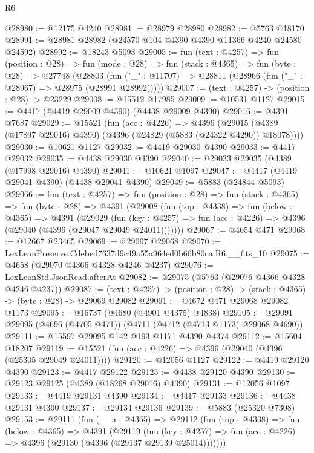 \begin{lexlean}{R6}
\begin{coremodule}
@28980 := @12175 @4240
@28981 := @28979 @28980
@28982 := @5763 @18170
@28991 := @28981 @28982 (@24570 @104 @4390 @4390 @11366 @4240 @24580 @24592)
@28992 := @18243 @5093
@29005 := fun (text : @4257) =>
  fun (position : @28) =>
  fun (mode : @28) =>
  fun (stack : @4365) =>
  fun (byte : @28) =>
  @27748
    (@28803 (fun ("_" : @11707) => @28811 (@28966 (fun ("_" : @28967) => @28975 (@28991 @28992)))))
@29007 := (text : @4257) -> (position : @28) -> @23229
@29008 := @15512 @17985
@29009 := @10531 @1127
@29015 := @4417 (@4419 @29009 @4390) (@4438 @29009 @4390)
@29016 := @4391 @7687
@29029 := @15521
    (fun (acc : @4226) =>
    @4396 (@29015 (@4389 (@17897 @29016) @4390) (@4396 (@24829 (@5883 (@24322 @4290)) @18078))))
@29030 := @10621 @1127
@29032 := @4419 @29030 @4390
@29033 := @4417 @29032
@29035 := @4438 @29030 @4390
@29040 := @29033 @29035 (@4389 (@17998 @29016) @4390)
@29041 := @10621 @1097
@29047 := @4417 (@4419 @29041 @4390) (@4438 @29041 @4390)
@29049 := @5883 (@24844 @5093)
@29066 := fun (text : @4257) =>
  fun (position : @28) =>
  fun (stack : @4365) =>
  fun (byte : @28) =>
  @4391
    (@29008
      (fun (top : @4338) =>
      fun (below : @4365) =>
      @4391
        (@29029
          (fun (key : @4257) =>
          fun (acc : @4226) => @4396 (@29040 (@4396 (@29047 @29049 @24011)))))))
@29067 := @4654 @471
@29068 := @12667 @23465
@29069 := @29067 @29068
@29070 := LexLeanPreserve.Cdebed7637d9c49a55a964ed0b66b80ca.R6.__fits_10
@29075 := @4658 (@29070 @4366 @4328 @4246 @4237)
@29076 := LexLeanStd.JsonRead.afterAt
@29082 := @29075 (@5763 (@29076 @4366 @4328 @4246 @4237))
@29087 := (text : @4257) -> (position : @28) -> (stack : @4365) -> (byte : @28) -> @29069 @29082
@29091 := @4672 @471 @29068 @29082 @1173
@29095 := @16737 (@4680 (@4901 @4375) @4838)
@29105 := @29091 @29095 (@4696 (@4705 @471)) (@4711 (@4712 (@4713 @1173) @29068 @4690))
@29111 := @15597 @29095 @142 @193 @1171 @4390 @4374
@29112 := @15604 @18207
@29119 := @15521 (fun (acc : @4226) => @4396 (@29040 (@4396 (@25305 @29049 @24011))))
@29120 := @12056 @1127
@29122 := @4419 @29120 @4390
@29123 := @4417 @29122
@29125 := @4438 @29120 @4390
@29130 := @29123 @29125 (@4389 (@18268 @29016) @4390)
@29131 := @12056 @1097
@29133 := @4419 @29131 @4390
@29134 := @4417 @29133
@29136 := @4438 @29131 @4390
@29137 := @29134 @29136
@29139 := @5883 (@25320 @7308)
@29153 := @29111
    (fun (__a : @4365) =>
    @29112
      (fun (top : @4338) =>
      fun (below : @4365) =>
      @4391
        (@29119
          (fun (key : @4257) =>
          fun (acc : @4226) => @4396 (@29130 (@4396 (@29137 @29139 @25014)))))))

\end{coremodule}
\end{lexlean}

